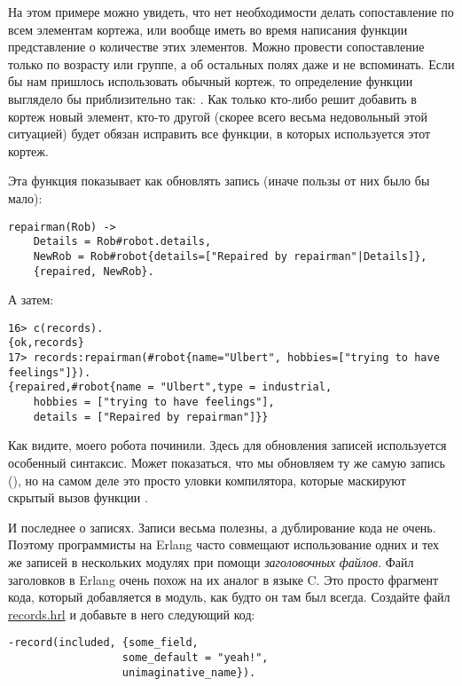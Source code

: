 На этом примере можно увидеть, что нет необходимости делать сопоставление по всем элементам кортежа, или вообще иметь во время написания функции представление о количестве этих элементов.
Можно провести сопоставление только по возрасту или группе, а об остальных полях даже и не вспоминать.
Если бы нам пришлось использовать обычный кортеж, то определение функции выглядело бы приблизительно так: .
Как только кто\--либо решит добавить в кортеж новый элемент, кто\--то другой (скорее всего весьма недовольный этой ситуацией) будет обязан исправить все функции, в которых используется этот кортеж.

Эта функция показывает как обновлять запись (иначе пользы от них было бы мало):
\begin{lstlisting}[style=erlang]
repairman(Rob) ->
    Details = Rob#robot.details,
    NewRob = Rob#robot{details=["Repaired by repairman"|Details]},
    {repaired, NewRob}.
\end{lstlisting}

А затем:
\begin{lstlisting}[style=erlang]
16> c(records).
{ok,records}
17> records:repairman(#robot{name="Ulbert", hobbies=["trying to have feelings"]}).
{repaired,#robot{name = "Ulbert",type = industrial,
    hobbies = ["trying to have feelings"],
    details = ["Repaired by repairman"]}}
\end{lstlisting}

Как видите, моего робота починили.
Здесь для обновления записей используется особенный синтаксис.
Может показаться, что мы обновляем ту же самую запись (), но на самом деле это просто уловки компилятора, которые маскируют скрытый вызов функции .

И последнее о записях.
Записи весьма полезны, а дублирование кода не очень.
Поэтому программисты на Erlang часто совмещают использование одних и тех же записей в нескольких модулях при помощи \emph{заголовочных файлов}.
Файл заголовков в Erlang очень похож на их аналог в языке C.
Это просто фрагмент кода, который добавляется в модуль, как будто он там был всегда.
Создайте файл \href{http://learnyousomeerlang.com/static/erlang/records.hrl}{records.hrl} и добавьте в него следующий код:
\begin{lstlisting}[style=erlang]
%% this is a .hrl (header) file.
-record(included, {some_field,
                  some_default = "yeah!",
                  unimaginative_name}).
\end{lstlisting}

